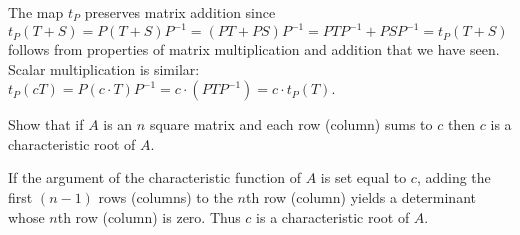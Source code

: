\begin{exercises}
\begin{answer}
      The map $t_P$ preserves matrix addition since
      $t_P(T+S)=P(T+S)P^{-1}=(PT+PS)P^{-1}=PTP^{-1}+PSP^{-1}=t_P(T+S)$
      follows from properties of matrix multiplication and addition that 
      we have seen.
      Scalar multiplication is 
      similar:~$t_P(cT)=P(c\cdot T)P^{-1}=c\cdot (PTP^{-1})=c\cdot t_P(T)$.
    \end{answer}
  \puzzle \item 
    Show that if \( A \) is an \( n \) square matrix and each row (column)
    sums to \( c \) then \( c \) is a characteristic root of \( A \).
    \cite{MathMag67p232}
    \begin{answer}
      \answerasgiven %
      If the argument of the characteristic function of \( A \) is set equal
      to \( c \), adding the first \( (n-1) \) rows (columns) to the
      \( n \)th row (column) yields a determinant whose \( n \)th row
      (column) is zero.
      Thus \( c \) is a characteristic root of \( A \).  
    \end{answer}
\end{exercises}
